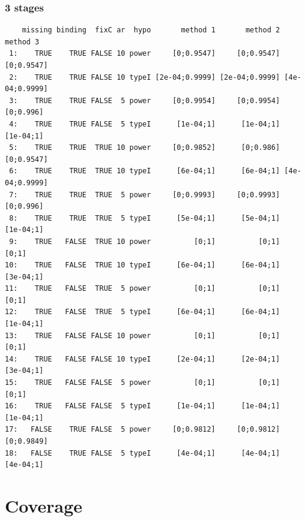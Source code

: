 \documentclass[12pt]{article}
\begin{document}
\subsubsection{3 stages}
\label{sec:orgfe0340b}
\begin{verbatim}
    missing binding  fixC ar  hypo       method 1       method 2       method 3
 1:    TRUE    TRUE FALSE 10 power     [0;0.9547]     [0;0.9547]     [0;0.9547]
 2:    TRUE    TRUE FALSE 10 typeI [2e-04;0.9999] [2e-04;0.9999] [4e-04;0.9999]
 3:    TRUE    TRUE FALSE  5 power     [0;0.9954]     [0;0.9954]      [0;0.996]
 4:    TRUE    TRUE FALSE  5 typeI      [1e-04;1]      [1e-04;1]      [1e-04;1]
 5:    TRUE    TRUE  TRUE 10 power     [0;0.9852]      [0;0.986]     [0;0.9547]
 6:    TRUE    TRUE  TRUE 10 typeI      [6e-04;1]      [6e-04;1] [4e-04;0.9999]
 7:    TRUE    TRUE  TRUE  5 power     [0;0.9993]     [0;0.9993]      [0;0.996]
 8:    TRUE    TRUE  TRUE  5 typeI      [5e-04;1]      [5e-04;1]      [1e-04;1]
 9:    TRUE   FALSE  TRUE 10 power          [0;1]          [0;1]          [0;1]
10:    TRUE   FALSE  TRUE 10 typeI      [6e-04;1]      [6e-04;1]      [3e-04;1]
11:    TRUE   FALSE  TRUE  5 power          [0;1]          [0;1]          [0;1]
12:    TRUE   FALSE  TRUE  5 typeI      [6e-04;1]      [6e-04;1]      [1e-04;1]
13:    TRUE   FALSE FALSE 10 power          [0;1]          [0;1]          [0;1]
14:    TRUE   FALSE FALSE 10 typeI      [2e-04;1]      [2e-04;1]      [3e-04;1]
15:    TRUE   FALSE FALSE  5 power          [0;1]          [0;1]          [0;1]
16:    TRUE   FALSE FALSE  5 typeI      [1e-04;1]      [1e-04;1]      [1e-04;1]
17:   FALSE    TRUE FALSE  5 power     [0;0.9812]     [0;0.9812]     [0;0.9849]
18:   FALSE    TRUE FALSE  5 typeI      [4e-04;1]      [4e-04;1]      [4e-04;1]
\end{verbatim}

\clearpage 

\section{Coverage}
\label{sec:org55db3ee}
\end{document}
